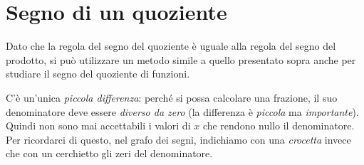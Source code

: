 
\section{Segno di un quoziente}
\label{sec:dis_quoziente}

Dato che la regola del segno del quoziente è uguale alla regola del 
segno del prodotto,
si può utilizzare un metodo simile a quello presentato sopra anche 
per studiare il segno del quoziente di funzioni.

C'è un'unica \emph{piccola differenza}: perché si possa calcolare una 
frazione, il suo denominatore deve essere \emph{diverso da zero} (la 
differenza è \emph{piccola} ma \emph{importante}). 
Quindi non sono mai accettabili i valori di \(x\) che rendono nullo il 
denominatore.
Per ricordarci di questo, nel grafo dei segni, indichiamo con una 
\emph{crocetta} invece che con un cerchietto gli zeri del denominatore.

